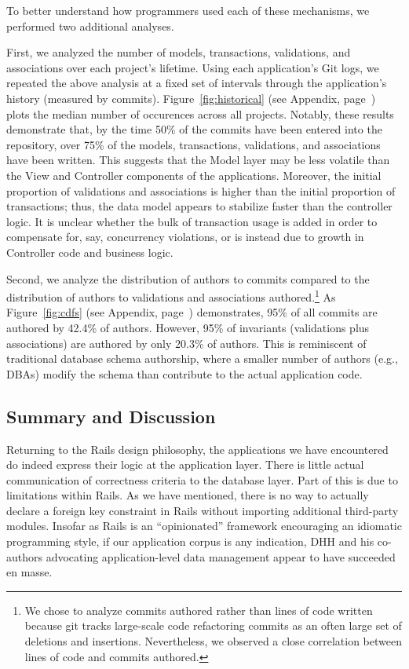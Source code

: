  To better understand how programmers
used each of these mechanisms, we performed two additional
analyses.

First, we analyzed the number of models, transactions, validations,
and associations over each project's lifetime. Using each
application's Git logs, we repeated the above analysis at a fixed set
of intervals through the application's history (measured by
commits). Figure~\ref{fig:historical} (see Appendix, page~\pageref{fig:historical}) plots the median number of
occurences across all projects. Notably, these results demonstrate
that, by the time 50\% of the commits have been entered into the
repository, over 75\% of the models, transactions, validations, and
associations have been written. This suggests that the Model layer may
be less volatile than the View and Controller components of the
applications. Moreover, the initial proportion of validations and
associations is higher than the initial proportion of transactions;
thus, the data model appears to stabilize faster than the controller
logic. It is unclear whether the bulk of transaction usage is added in
order to compensate for, say, concurrency violations, or is instead
due to growth in Controller code and business logic.


Second, we analyze the distribution of authors to commits compared to
the distribution of authors to validations and associations
authored.\footnote{We chose to analyze commits authored rather than
  lines of code written because git tracks large-scale code
  refactoring commits as an often large set of deletions and
  insertions. Nevertheless, we observed a close correlation between
  lines of code and commits authored.} As Figure~\ref{fig:cdfs} (see
Appendix, page~\pageref{fig:cdfs}) demonstrates, 95\% of all commits are authored by 42.4\% of
authors. However, 95\% of invariants (validations plus associations)
are authored by only 20.3\% of authors. This is reminiscent of
traditional database schema authorship, where a smaller number of
authors (e.g., DBAs) modify the schema than contribute to the actual
application code.


\subsection{Summary and Discussion}

Returning to the Rails design philosophy, the applications we have
encountered do indeed express their logic at the application
layer. There is little actual communication of correctness criteria to
the database layer. Part of this is due to limitations within
Rails. As we have mentioned, there is no way to actually declare a
foreign key constraint in Rails without importing additional
third-party modules. Insofar as Rails is an ``opinionated'' framework
encouraging an idiomatic programming style, if our application corpus
is any indication, DHH and his co-authors advocating application-level
data management appear to have succeeded en masse.


